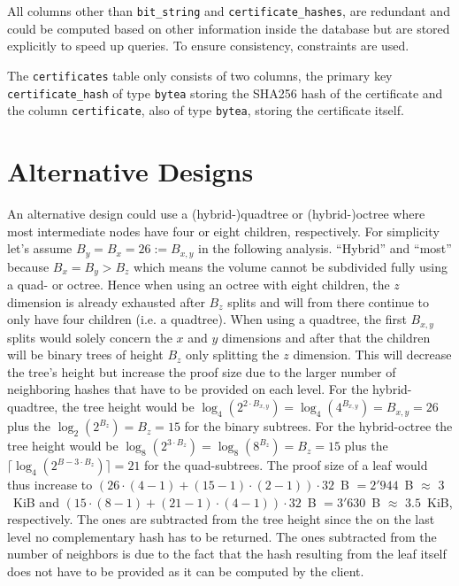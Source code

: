 \documentclass[10pt,conference,compsocconf]{IEEEtran}
\begin{document}
All columns other than \texttt{bit\_string} and \texttt{certificate\_hashes}, are redundant and could be computed based on other information inside the database but are stored explicitly to speed up queries.
To ensure consistency, constraints are used.

The \texttt{certificates} table only consists of two columns, the primary key \texttt{certificate\_hash} of type \texttt{bytea} storing the SHA256 hash of the certificate and the column \texttt{certificate}, also of type \texttt{bytea}, storing the certificate itself.

\section{Alternative Designs}
\label{sec:alternative-designs}

An alternative design could use a (hybrid-)quadtree or (hybrid-)octree where most intermediate nodes have four or eight children, respectively.
For simplicity let's assume $B_{y} = B_{x} = 26 := B_{x,y}$ in the following analysis.
``Hybrid'' and ``most'' because $B_{x} = B_{y} > B_{z}$ which means the volume cannot be subdivided fully using a quad- or octree.
Hence when using an octree with eight children, the $z$ dimension is already exhausted after $B_{z}$ splits and will from there continue to only have four children (i.e. a quadtree).
When using a quadtree, the first $B_{x,y}$ splits would solely concern the $x$ and $y$ dimensions and after that the children will be binary trees of height $B_{z}$ only splitting the $z$ dimension.
This will decrease the tree's height but increase the proof size due to the larger number of neighboring hashes that have to be provided on each level.
For the hybrid-quadtree, the tree height would be $\log_4(2^{2 \cdot B_{x,y}})= \log_4(4^{B_{x,y}}) = B_{x,y} = 26$ plus the $\log_2(2^{B_z}) = B_z = 15$ for the binary subtrees.
For the hybrid-octree the tree height would be
$\log_8(2^{3 \cdot B_z}) = \log_8(8^{B_z}) = B_z = 15$ plus the $\lceil \log_4(2^{B - 3 \cdot B_z}) \rceil = 21$ for the quad-subtrees.
The proof size of a leaf would thus increase to $(26 \cdot (4 - 1) + (15 - 1) \cdot (2 - 1)) \cdot 32$~B $= 2'944$~B $\approx$ $3$~KiB and $(15 \cdot (8 - 1) + (21 - 1) \cdot (4 - 1)) \cdot 32$~B $= 3'630$~B $\approx$ $3.5$~KiB, respectively.
The ones are subtracted from the tree height since the on the last level no complementary hash has to be returned.
The ones subtracted from the number of neighbors is due to the fact that the hash resulting from the leaf itself does not have to be provided as it can be computed by the client.
\end{document}
